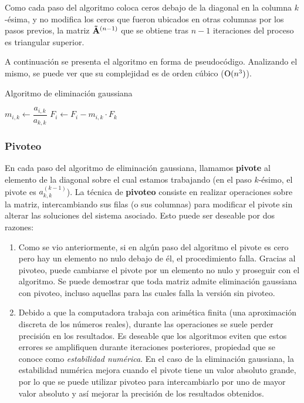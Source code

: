 Como cada paso del algoritmo coloca ceros debajo de la diagonal en la columna
$k$-ésima, y no modifica los ceros que fueron ubicados en otras columnas por
los pasos previos, la matriz $\mathbf{\tilde A}^{(n-1)}$ que se obtiene tras
$n-1$ iteraciones del proceso es triangular superior.

A continuación se presenta el algoritmo en forma de pseudocódigo. Analizando
el mismo, se puede ver que su complejidad es de orden cúbico ($\mathrm{O}(n^3)$).

\begin{algorithm}[H]
\caption{Algoritmo de eliminación gaussiana}
\label{algo:eliminacion-gauss}

 {
     {
         {
            $m_{i,k} \gets \dfrac{a_{i,k}}{a_{k,k}}$ \;
            $F_i \gets F_i - m_{i,k} \cdot F_k$ \;
        }
    }
    {
         {
            \Error
        }
    }
}
\end{algorithm}

\subsubsection{Pivoteo}

En cada paso del algoritmo de eliminación gaussiana, llamamos \textbf{pivote}
al elemento de la diagonal sobre el cual estamos trabajando (en el paso
$k$-ésimo, el pivote es $a^{(k-1)}_{k,k}$). La técnica de \textbf{pivoteo}
consiste en realizar operaciones sobre la matriz, intercambiando sus filas
(o sus columnas) para modificar el pivote sin alterar las soluciones
del sistema asociado. Esto puede ser deseable por dos razones:

\begin{enumerate}
\item Como se vio anteriormente, si en algún paso del algoritmo el pivote
    es cero pero hay un elemento no nulo debajo de él, el procedimiento
    falla. Gracias al pivoteo, puede cambiarse el pivote por un elemento no
    nulo y proseguir con el algoritmo. Se puede demostrar que
    toda matriz admite eliminación gaussiana con pivoteo, incluso aquellas
    para las cuales falla la versión sin pivoteo.
\item Debido a que la computadora trabaja con arimética finita (una
    aproximación discreta de los números reales), durante las operaciones se
    suele perder precisión en los resultados. Es deseable que los algoritmos
    eviten que estos errores se amplifiquen durante iteraciones posteriores,
    propiedad que se conoce como \emph{estabilidad numérica}. En el caso de
    la eliminación gaussiana, la estabilidad numérica mejora cuando el
    pivote tiene un valor absoluto grande, por lo que se puede utilizar
    pivoteo para intercambiarlo por uno de mayor valor absoluto y así mejorar
    la precisión de los resultados obtenidos.
\end{enumerate}

